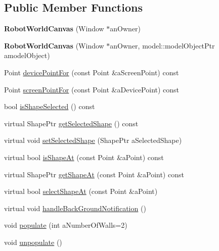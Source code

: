 \subsection*{Public Member Functions}
\begin{DoxyCompactItemize}
\item 
{\bfseries Robot\+World\+Canvas} (Window $\ast$an\+Owner)\hypertarget{class_view_1_1_robot_world_canvas_afc6ffd527bcd9970f12e5fd70a841782}{}\label{class_view_1_1_robot_world_canvas_afc6ffd527bcd9970f12e5fd70a841782}

\item 
{\bfseries Robot\+World\+Canvas} (Window $\ast$an\+Owner, model\+::\+model\+Object\+Ptr a\+model\+Object)\hypertarget{class_view_1_1_robot_world_canvas_aff3e613f2782874b4560a015be7b6180}{}\label{class_view_1_1_robot_world_canvas_aff3e613f2782874b4560a015be7b6180}

\item 
Point \hyperlink{class_view_1_1_robot_world_canvas_a7cffeb2971aaac6039398b6d896fd3b1}{device\+Point\+For} (const Point \&a\+Screen\+Point) const 
\item 
Point \hyperlink{class_view_1_1_robot_world_canvas_a0f505fef4f08daaa9ebd21ff392c698f}{screen\+Point\+For} (const Point \&a\+Device\+Point) const 
\item 
bool \hyperlink{class_view_1_1_robot_world_canvas_ac4fefdf43774d0f90c469527b1d27fd3}{is\+Shape\+Selected} () const 
\item 
virtual Shape\+Ptr \hyperlink{class_view_1_1_robot_world_canvas_aefd5c6dc27fe807047996443797594a0}{get\+Selected\+Shape} () const 
\item 
virtual void \hyperlink{class_view_1_1_robot_world_canvas_a51477f3840089817d00ed6f2dee7c69e}{set\+Selected\+Shape} (Shape\+Ptr a\+Selected\+Shape)
\item 
virtual bool \hyperlink{class_view_1_1_robot_world_canvas_a38bc5c3dd6eb99504fc1ada58ed39a14}{is\+Shape\+At} (const Point \&a\+Point) const 
\item 
virtual Shape\+Ptr \hyperlink{class_view_1_1_robot_world_canvas_a625bdb271e6426cc7c228c4c71eebedf}{get\+Shape\+At} (const Point \&a\+Point) const 
\item 
virtual bool \hyperlink{class_view_1_1_robot_world_canvas_a91fc7b9d37d228ba9285fe82dab04fbb}{select\+Shape\+At} (const Point \&a\+Point)
\item 
virtual void \hyperlink{class_view_1_1_robot_world_canvas_a19aa6f46000f7f7db267f6aec911f25f}{handle\+Back\+Ground\+Notification} ()
\item 
void \hyperlink{class_view_1_1_robot_world_canvas_ab498b81c0619bc6109548582addc7e02}{populate} (int a\+Number\+Of\+Walls=2)
\item 
void \hyperlink{class_view_1_1_robot_world_canvas_a20eb2ae3ba32d1a1b8994025e0c6bc39}{unpopulate} ()
\end{DoxyCompactItemize}
